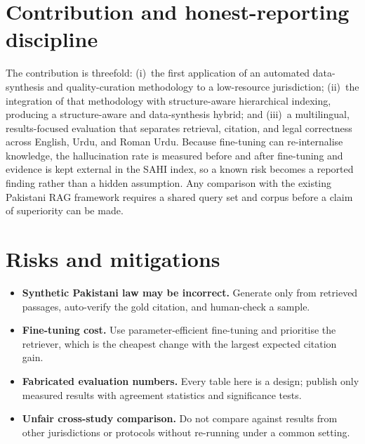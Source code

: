 \documentclass[10pt,twocolumn]{article}
\begin{document}
\section{Contribution and honest-reporting discipline}
\label{sec:rd-contribution}

The contribution is threefold: (i)~the first application of an automated data-synthesis and
quality-curation methodology to a low-resource jurisdiction; (ii)~the integration of that methodology
with structure-aware hierarchical indexing, producing a structure-aware and data-synthesis hybrid; and
(iii)~a multilingual, results-focused evaluation that separates retrieval, citation, and legal
correctness across English, Urdu, and Roman Urdu. Because fine-tuning can re-internalise knowledge, the
hallucination rate is measured before and after fine-tuning and evidence is kept external in the SAHI
index, so a known risk becomes a reported finding rather than a hidden assumption. Any comparison with
the existing Pakistani RAG framework \citep{ref312025} requires a shared query set and corpus before a
claim of superiority can be made.

\section{Risks and mitigations}
\label{sec:rd-risks}

\begin{itemize}[leftmargin=1.4em, itemsep=2pt, topsep=2pt]
\item \textbf{Synthetic Pakistani law may be incorrect.} Generate only from retrieved passages,
auto-verify the gold citation, and human-check a sample.
\item \textbf{Fine-tuning cost.} Use parameter-efficient fine-tuning and prioritise the retriever, which
is the cheapest change with the largest expected citation gain.
\item \textbf{Fabricated evaluation numbers.} Every table here is a design; publish only measured results
with agreement statistics and significance tests.
\item \textbf{Unfair cross-study comparison.} Do not compare against results from other jurisdictions or
protocols without re-running under a common setting.
\end{itemize}



\end{document}
